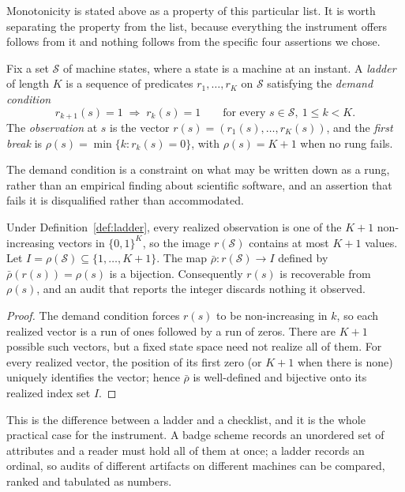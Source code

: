 Monotonicity is stated above as a property of this particular list. It is worth
separating the property from the list, because everything the instrument offers
follows from it and nothing follows from the specific four assertions we chose.

\begin{definition}[Ladder]\label{def:ladder}
Fix a set $\mathcal{S}$ of machine states, where a state is a machine at an
instant. A \emph{ladder} of length $K$ is a sequence of predicates
$r_1,\dots,r_K$ on $\mathcal{S}$ satisfying the \emph{demand condition}
\[
  r_{k+1}(s) = 1 \;\Longrightarrow\; r_k(s) = 1
  \qquad\text{for every } s \in \mathcal{S},\ 1 \le k < K .
\]
The \emph{observation} at $s$ is the vector $r(s) = (r_1(s),\dots,r_K(s))$, and
the \emph{first break} is
$\rho(s) = \min\{k : r_k(s) = 0\}$, with $\rho(s) = K+1$ when no rung fails.
\end{definition}

The demand condition is a constraint on what may be written down as a rung,
rather than an empirical finding about scientific software, and an assertion
that fails it is disqualified rather than accommodated.

\begin{proposition}\label{prop:sufficient}
Under Definition~\ref{def:ladder}, every realized observation is one of the
$K+1$ non-increasing vectors in $\{0,1\}^K$, so the image $r(\mathcal{S})$
contains at most $K+1$ values. Let $I=\rho(\mathcal{S})\subseteq
\{1,\dots,K+1\}$. The map $\bar\rho:r(\mathcal{S})\to I$ defined by
$\bar\rho(r(s))=\rho(s)$ is a bijection. Consequently $r(s)$ is recoverable
from $\rho(s)$, and an audit that reports the integer discards nothing it
observed.
\end{proposition}

\begin{proof}
The demand condition forces $r(s)$ to be non-increasing in $k$, so each realized
vector is a run of ones followed by a run of zeros. There are $K+1$ possible
such vectors, but a fixed state space need not realize all of them. For every
realized vector, the position of its first zero (or $K+1$ when there is none)
uniquely identifies the vector; hence $\bar\rho$ is well-defined and bijective
onto its realized index set $I$.
\end{proof}

This is the difference between a ladder and a checklist, and it is the whole
practical case for the instrument. A badge scheme records an unordered set of
attributes and a reader must hold all of them at once; a ladder records an
ordinal, so audits of different artifacts on different machines can be compared,
ranked and tabulated as numbers.

